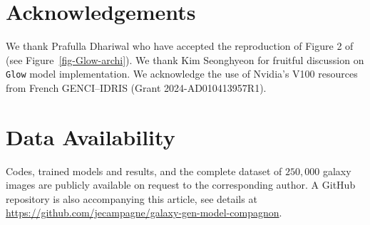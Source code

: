 \documentclass[fleqn,usenatbib]{mnras}
\begin{document}
%
\section*{Acknowledgements}
We thank Prafulla Dhariwal who have accepted the reproduction of Figure 2 of  \cite{Kingma2018} (see Figure~\ref{fig-Glow-archi}). We thank Kim Seonghyeon for fruitful discussion on \texttt{Glow} model implementation. We acknowledge the use of  Nvidia’s V100 resources from French GENCI–IDRIS (Grant 2024-AD010413957R1).

\section*{Data Availability}
Codes, trained models and results, and the complete dataset of $250,000$ galaxy images are publicly available on request to the corresponding author. A GitHub repository is also accompanying this article, see details at \url{https://github.com/jecampagne/galaxy-gen-model-compagnon}. 

  

\bsp	%
\label{lastpage}
\end{document}
